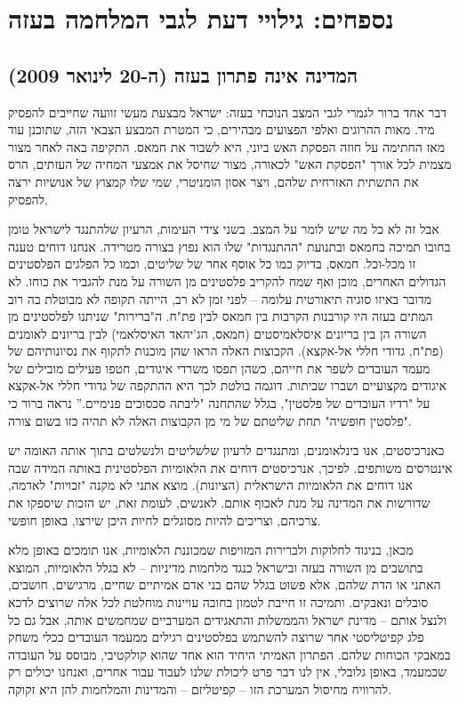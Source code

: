 \section{נספחים: גילויי דעת לגבי המלחמה בעזה}

\subsection{המדינה אינה פתרון בעזה (ה-20 לינואר 2009)}

דבר אחד ברור לגמרי לגבי המצב הנוכחי בעזה: ישראל מבצעת מעשי זוועה שחייבים להפסיק מיד. מאות ההרוגים ואלפי הפצועים מבהירים, כי המטרת המבצע הצבאי הזה, שתוכנן עוד מאז החתימה על חוזה הפסקת האש ביוני, היא לשבור את חמאס. התקיפה באה לאחר מצור מצמית לכל אורך "הפסקת האש" לכאורה, מצור שחיסל את אמצעי המחיה של העזתים, הרס את התשתית האזרחית שלהם, ויצר אסון הומניטרי, שמי שלו קמצוץ של אנושיות ירצה להפסיק.

אבל זה לא כל מה שיש לומר על המצב. בשני צידי העימות, הרעיון שלהתנגד לישראל טומן בחובו תמיכה בחמאס ובתנועת "ההתנגדות" שלו הוא נפוץ בצורה מטרידה. אנחנו דוחים טענה זו מכל-וכל. חמאס, בדיוק כמו כל אוסף אחר של שליטים, וכמו כל הפלגים הפלסטינים הגדולים האחרים, מוכן ואף שמח להקריב פלסטינים מן השורה על מנת להגביר את כוחו. לא מדובר באיזו סוגיה תיאורטית עלומה – לפני זמן לא רב, הייתה תקופה לא מבוטלת בה רוב המתים בעזה היו קורבנות הקרבות בין חמאס לבין פת"ח. ה"ברירות" שניתנו לפלסטינים מן השורה הן בין בריונים איסלאמיסטים (חמאס, הג'יהאד האיסלאמי) לבין בריונים לאומנים (פת"ח, גדודי חללי אל-אקצא). הקבוצות האלה הראו שהן מוכנות לתקוף את נסיונותיהם של מעמד העובדים לשפר את חייהם, כשהן תפסו משרדי איגודים, חטפו פעילים מובילים של איגודים מקצועיים ושברו שביתות. דוגמה בולטת לכך היא ההתקפה של גדודי חללי אל-אקצא על "רדיו העובדים של פלסטין", בגלל שהתחנה "ליבתה סכסוכים פנימיים.” נראה ברור כי "פלסטין חופשיה" תחת שליטתם של מי מן הקבוצות האלה לא תהיה כזו בשום צורה.

כאנרכיסטים, אנו בינלאומנים, ומתנגדים לרעיון שלשליטים ולנשלטים בתוך אותה האומה יש אינטרסים משותפים. לפיכך, אנרכיסטים דוחים את הלאומיות הפלסטינית באותה המידה שבה אנו דוחים את הלאומיות הישראלית (הציונות). מוצא אתני לא מקנה "זכויות" לאדמה, שדורשות את המדינה על מנת לאכוף אותם. לאנשים, לעומת זאת, יש הזכות שיספקו את צרכיהם, וצריכים להיות מסוגלים לחיות היכן שירצו, באופן חופשי.

מכאן, בניגוד לחלוקות ולברירות המזויפות שמכוננת הלאומיות, אנו תומכים באופן מלא בתושבים מן השורה בעזה ובישראל כנגד מלחמות מדיניות – לא בגלל הלאומיות, המוצא האתני או הדת שלהם, אלא פשוט בגלל שהם בני אדם אמיתיים שחיים, מרגישים, חושבים, סובלים ונאבקים. ותמיכה זו חייבת לטמון בחובה עויינות מוחלטת לכל אלה שרוצים לדכא ולנצל אותם – מדינת ישראל והממשלות והתאגידים המערביים שמחמשים אותה, אבל גם כל פלג קפיטליסטי אחר שרוצה להשתמש בפלסטינים רגילים ממעמד העובדים ככלי משחק במאבקי הכוחות שלהם. הפתרון האמיתי היחיד הוא אחד שהוא קולקטיבי, מבוסס על העובדה שכמעמד, באופן גלובלי, אין לנו דבר פרט ליכולת שלנו לעבוד עבור אחרים, ואנחנו יכולים רק להרוויח מחיסול המערכת הזו – קפיטליזם – והמדינות והמלחמות להן היא זקוקה.

